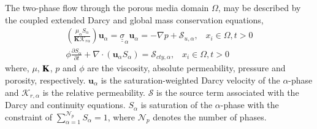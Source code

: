 \documentclass[preprint,authoryear,12pt]{elsarticle}
\begin{document}
\medskip
The two-phase flow through the porous media domain $\Omega$, may be described by the coupled extended Darcy and global mass conservation equations,
\begin{eqnarray}
\left(\displaystyle\frac{\mu_{\alpha}S_{\alpha}}{{\mathbf K}\mathcal{K}_{r\alpha}}\right) {\mathbf u}_{\alpha} = \underline{\underline{\sigma}}_{\alpha} {\mathbf u}_{\alpha} = -\nabla p + \mathcal{S}_{u,\alpha},\;\;\; x_{i}\in\Omega, t>0 \label{eqn:darcy_eqn} \\
\phi\displaystyle\frac{\partial S_{\alpha} }{\partial t} +   \nabla \cdot \left( {\mathbf u}_{\alpha}  S_{\alpha}\right) =  \mathcal{S}_{cty,\alpha},\;\;\; x_{i}\in\Omega, t>0\label{eqn:saturation_eqn}
\end{eqnarray}
where, $\mu$, ${\bf K}$, $p$ and $\phi$ are the viscosity, absolute permeability, pressure and porosity, respectively. ${\mathbf u}_{\alpha}$ is the saturation-weighted Darcy velocity of the $\alpha$-phase and $\mathcal{K}_{r,\alpha}$ is the relative permeability. $\mathcal{S}$ is the source term associated with the Darcy and continuity equations. $S_{\alpha}$ is saturation of the $\alpha$-phase with the constraint of $\sum\limits_{\alpha=1}^{\mathcal{N}_{p}} S_{\alpha} = 1$, where $\mathcal{N}_{p}$ denotes the number of phases.

\end{document}
